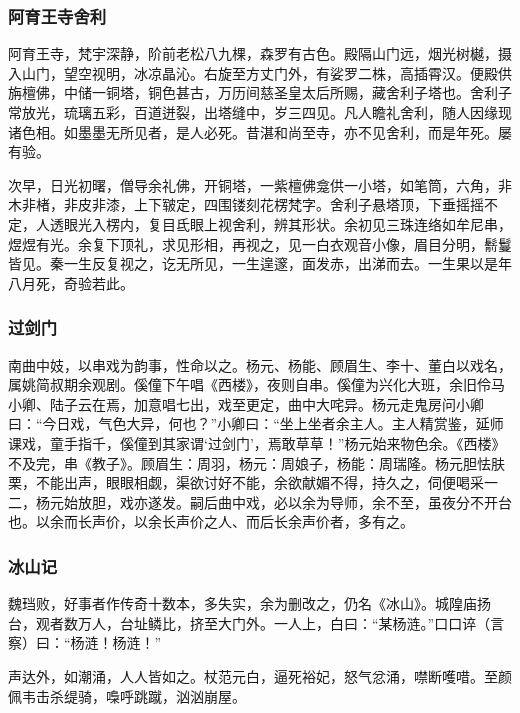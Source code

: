 \documentclass[]{article}
\begin{document}
\hypertarget{header-n585}{%
\subsubsection{阿育王寺舍利}\label{header-n585}}

阿育王寺，梵宇深静，阶前老松八九棵，森罗有古色。殿隔山门远，烟光树樾，摄入山门，望空视明，冰凉晶沁。右旋至方丈门外，有娑罗二株，高插霄汉。便殿供旃檀佛，中储一铜塔，铜色甚古，万历间慈圣皇太后所赐，藏舍利子塔也。舍利子常放光，琉璃五彩，百道迸裂，出塔缝中，岁三四见。凡人瞻礼舍利，随人因缘现诸色相。如墨墨无所见者，是人必死。昔湛和尚至寺，亦不见舍利，而是年死。屡有验。

次早，日光初曙，僧导余礼佛，开铜塔，一紫檀佛龛供一小塔，如笔筒，六角，非木非楮，非皮非漆，上下皲定，四围镂刻花楞梵字。舍利子悬塔顶，下垂摇摇不定，人透眼光入楞内，复目氐眼上视舍利，辨其形状。余初见三珠连络如牟尼串，煜煜有光。余复下顶礼，求见形相，再视之，见一白衣观音小像，眉目分明，鬋鬘皆见。秦一生反复视之，讫无所见，一生遑邃，面发赤，出涕而去。一生果以是年八月死，奇验若此。

\hypertarget{header-n590}{%
\subsubsection{过剑门}\label{header-n590}}

南曲中妓，以串戏为韵事，性命以之。杨元、杨能、顾眉生、李十、董白以戏名，属姚简叔期余观剧。傒僮下午唱《西楼》，夜则自串。傒僮为兴化大班，余旧伶马小卿、陆子云在焉，加意唱七出，戏至更定，曲中大咤异。杨元走鬼房问小卿曰：``今日戏，气色大异，何也？''小卿曰：``坐上坐者余主人。主人精赏鉴，延师课戏，童手指千，傒僮到其家谓`过剑门'，焉敢草草！''杨元始来物色余。《西楼》不及完，串《教子》。顾眉生：周羽，杨元：周娘子，杨能：周瑞隆。杨元胆怯肤栗，不能出声，眼眼相觑，渠欲讨好不能，余欲献媚不得，持久之，伺便喝采一二，杨元始放胆，戏亦遂发。嗣后曲中戏，必以余为导师，余不至，虽夜分不开台也。以余而长声价，以余长声价之人、而后长余声价者，多有之。

\hypertarget{header-n595}{%
\subsubsection{冰山记}\label{header-n595}}

魏珰败，好事者作传奇十数本，多失实，余为删改之，仍名《冰山》。城隍庙扬台，观者数万人，台址鳞比，挤至大门外。一人上，白曰：``某杨涟。''口口谇（言察）曰：``杨涟！杨涟！''

声达外，如潮涌，人人皆如之。杖范元白，逼死裕妃，怒气忿涌，噤断嚄唶。至颜佩韦击杀缇骑，嘄呼跳蹴，汹汹崩屋。
\end{document}

